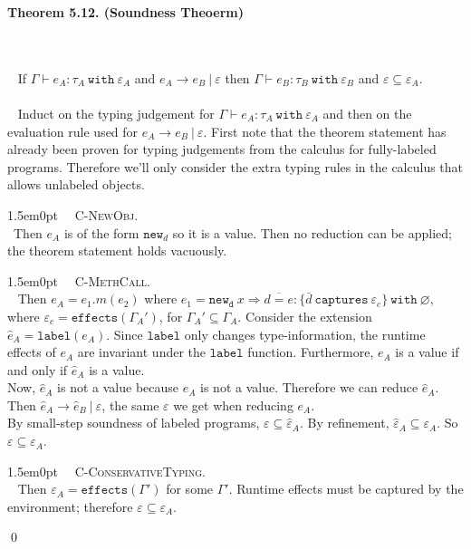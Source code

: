 \documentclass{llncs}
\newcommand{\keywadj}[1]{\mathtt{#1}}
\newcommand{\keyw}[1]{\keywadj{#1}~}
\newcommand{\thm}[3]{
	\begin{large}
		\bf{#1}
	\end{large} \\\\
	\fbox{Statement.} ~ #2
	\fbox{Proof.}~ #3 \qed
}
\newcommand{\proofcase}[2]{
	\begin{adjustwidth}{1.5em}{0pt}
		\fbox{Case.}~~#1. \\ ~#2
	\end{adjustwidth}
}
\begin{document}
\thm{Theorem 5.12. (Soundness Theoerm)}
{If $\Gamma \vdash e_A : \tau_A~\keyw{with} \varepsilon_A$ and $e_A \longrightarrow e_B~|~\varepsilon$ then $\Gamma \vdash e_B : \tau_B~\keyw{with} \varepsilon_B$ and $\varepsilon \subseteq \varepsilon_A$.\\\\}
{Induct on the typing judgement for $\Gamma \vdash e_A : \tau_A~\keyw{with} \varepsilon_A$ and then on the evaluation rule used for $e_A \longrightarrow e_B~|~\varepsilon$. First note that the theorem statement has already been proven for typing judgements from the calculus for fully-labeled programs. Therefore we'll only consider the extra typing rules in the calculus that allows unlabeled objects.

\proofcase{\textsc{C-NewObj}}
{Then $e_A$ is of the form $\keywadj{new}_d$ so it is a value. Then no reduction can be applied; the theorem statement holds vacuously.
}

\proofcase{\textsc{C-MethCall}}
{
Then $e_A = e_1.m(e_2)$ where $e_1 = \keyw{new_d} x \Rightarrow \overline{d = e} : \{ \bar d~\keyw{captures} \varepsilon_c \}~ \keyw{with} \varnothing$, where $\varepsilon_c = \keywadj{effects}(\Gamma_A')$, for $\Gamma_A' \subseteq \Gamma_A$. Consider the extension $\hat e_A = \keywadj{label}(e_A)$. Since $\keywadj{label}$ only changes type-information, the runtime effects of $e_A$ are invariant under the $\keywadj{label}$ function. Furthermore, $e_A$ is a value if and only if $\hat e_A$ is a value.\\

\noindent
Now, $\hat e_A$ is not a value because $e_A$ is not a value. Therefore we can reduce $\hat e_A$. Then $\hat e_A \longrightarrow \hat e_B~|~\varepsilon$, the same $\varepsilon$ we get when reducing $e_A$. \\

\noindent
By small-step soundness of labeled programs, $\varepsilon \subseteq \hat \varepsilon_A$. By refinement, $\hat \varepsilon_A \subseteq \varepsilon_A$. So $\varepsilon \subseteq \varepsilon_A$.
}

\proofcase{\textsc{C-ConservativeTyping}}
{
Then $\varepsilon_A = \keywadj{effects}(\Gamma')$ for some $\Gamma'$. Runtime effects must be captured by the environment; therefore $\varepsilon \subseteq \varepsilon_A$.
}
}
\end{document}
